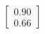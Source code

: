 \documentclass[preview]{standalone}
\begin{document}
\begin{align*}
\begin{bmatrix} 0.90 \\ 0.66 \end{bmatrix}
\end{align*}
\end{document}
